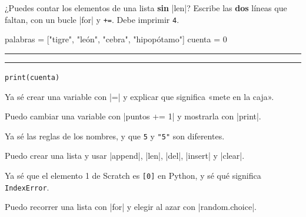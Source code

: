 \medskip
\begin{puzzle}
¿Puedes contar los elementos de una lista \textbf{sin} \py|len|? Escribe las \textbf{dos} líneas que faltan, con un bucle \py|for| y \texttt{+=}. Debe imprimir \texttt{4}.
\begin{codenonum}
palabras = ["tigre", "león", "cebra", "hipopótamo"]
cuenta = 0
\end{codenonum}
\vspace{10pt}
\rule{\linewidth}{0.4pt}\par\vspace{10pt}
\rule{\linewidth}{0.4pt}\par\vspace{2pt}
\hspace*{8pt}\texttt{print(cuenta)}
\end{puzzle}

\smallskip
\begin{tcolorbox}[colback=variables!10, colframe=variables!80!black, arc=6pt, boxrule=0.8pt, left=10pt, top=2pt, bottom=2pt, title={\textbf{Lista de la Parte 3}}, coltitle=white, colbacktitle=variables!80!black]
\tick Ya sé crear una variable con \py|=| y explicar que significa «mete en la caja».\par
\tick Puedo cambiar una variable con \py|puntos += 1| y mostrarla con \py|print|.\par
\tick Ya sé las reglas de los nombres, y que \texttt{5} y \texttt{"5"} son diferentes.\par
\tick Puedo crear una lista y usar \py|append|, \py|len|, \py|del|, \py|insert| y \py|clear|.\par
\tick Ya sé que el elemento 1 de Scratch es \texttt{[0]} en Python, y sé qué significa \texttt{IndexError}.\par
\tick Puedo recorrer una lista con \py|for| y elegir al azar con \py|random.choice|.
\end{tcolorbox}
